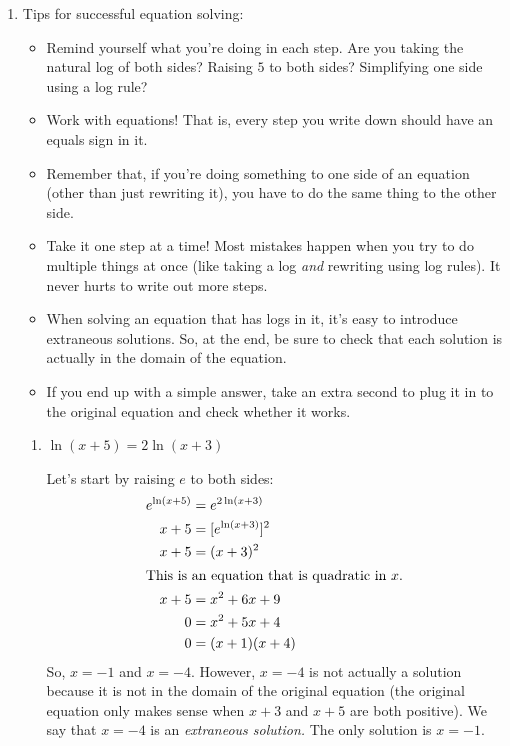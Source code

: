 \documentclass{article}
\begin{document}
\begin{enumerate}[resume]
\item  \label{equations-with-multiple-logs}
\begin{problemonly}
    {\LARGE\Pointinghand} Tips for successful equation solving:
    \begin{itemize}[nosep]
    \item Remind yourself what you're doing in each step. Are you taking the natural log of both sides? Raising $5$ to both sides? Simplifying one side using a log rule?
    \item Work with equations! That is, every step you write down should have an equals sign in it.
    \item Remember that, if you're doing something to one side of an equation (other than just rewriting it), you have to do the same thing to the other side.
    \item Take it one step at a time! Most mistakes happen when you try to do multiple things at once (like taking a log \textit{and} rewriting using log rules). It never hurts to write out more steps.
    \item When solving an equation that has logs in it, it's easy to introduce extraneous solutions. So, at the end, be sure to check that each solution is actually in the domain of the equation.
    \item If you end up with a simple answer, take an extra second to plug it in to the original equation and check whether it works.
    \end{itemize}
  \end{problemonly}
  \begin{enumerate}
  \item


    \begin{problem}[\vfill]
      $\ln(x + 5) = 2 \ln (x + 3)$
    \end{problem}

    \begin{solution}
      Let's start by raising $e$ to both sides:
      \begin{align*}
        e^{\ln (x + 5)} &= e^{2 \ln(x + 3)} \\
        x + 5 &= [e^{\ln (x + 3)}]^2 \\
        x + 5 &= (x + 3)^2 \\
        \intertext{This is an equation that is quadratic in $x$.}
        x + 5 &= x^2 + 6x + 9 \\
        0 &= x^2 + 5x + 4 \\
        0 &= (x + 1)(x + 4) 
      \end{align*}
      So, $x = -1$ and $x = -4$. However, $x = -4$ is not actually a solution because it is not in the domain of the original equation (the original equation only makes sense when $x + 3$ and $x + 5$ are both positive). We say that $x=-4$ is an \textit{extraneous
      solution.} The only solution is $x = \boxed{-1}$.
    \end{solution}


\end{enumerate}
\end{enumerate}
\end{document}
